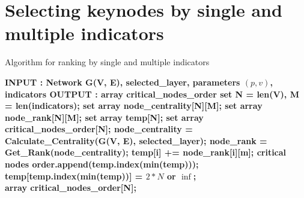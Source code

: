 

\chapter{Selecting keynodes by single and multiple indicators}

\begin{algorithm}[H]
	\caption{Algorithm for ranking by single and multiple indicators}
	\label{algo:keynodes}
	\begin{algorithmic} %
		\State  \bf{INPUT : Network G(V, E), selected\_layer, parameters $(p, v)$, indicators} \normalfont 
		\State  \bf{OUTPUT : array critical\_nodes\_order} \normalfont 
        \State set N = len(V), M = len(indicators);
		\State set array node\_centrality[N][M];
		\State set array node\_rank[N][M];
		\State set array temp[N];
		\State set array critical\_nodes\_order[N];
		\State node\_centrality = Calculate\_Centrality(G(V, E), selected\_layer);
		\State node\_rank = Get\_Rank(node\_centrality);
				\State temp[i] += node\_rank[i][m];
		 	\EndFor
		\EndFor
			\State critical nodes order.append(temp.index(min(temp)));
			\State temp[temp.index(min(temp))] = $2*N$ or $\inf$;
		\EndFor\\
		\Return array critical\_nodes\_order[N];
	\end{algorithmic}
\end{algorithm}
